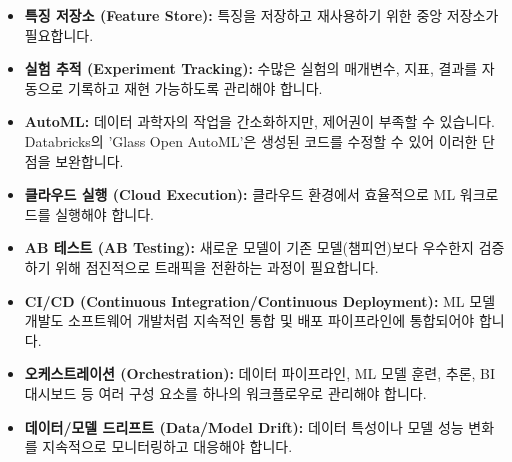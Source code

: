 \documentclass[11pt,a4paper]{article}
\begin{document}
\begin{tcolorbox}[summarybox={ML 개발의 숨겨진 복잡성}]
\begin{itemize}
    \item \textbf{특징 저장소 (Feature Store):} 특징을 저장하고 재사용하기 위한 중앙 저장소가 필요합니다.
    \item \textbf{실험 추적 (Experiment Tracking):} 수많은 실험의 매개변수, 지표, 결과를 자동으로 기록하고 재현 가능하도록 관리해야 합니다.
    \item \textbf{AutoML:} 데이터 과학자의 작업을 간소화하지만, 제어권이 부족할 수 있습니다. Databricks의 'Glass Open AutoML'은 생성된 코드를 수정할 수 있어 이러한 단점을 보완합니다.
    \item \textbf{클라우드 실행 (Cloud Execution):} 클라우드 환경에서 효율적으로 ML 워크로드를 실행해야 합니다.
    \item \textbf{AB 테스트 (AB Testing):} 새로운 모델이 기존 모델(챔피언)보다 우수한지 검증하기 위해 점진적으로 트래픽을 전환하는 과정이 필요합니다.
    \item \textbf{CI/CD (Continuous Integration/Continuous Deployment):} ML 모델 개발도 소프트웨어 개발처럼 지속적인 통합 및 배포 파이프라인에 통합되어야 합니다.
    \item \textbf{오케스트레이션 (Orchestration):} 데이터 파이프라인, ML 모델 훈련, 추론, BI 대시보드 등 여러 구성 요소를 하나의 워크플로우로 관리해야 합니다.
    \item \textbf{데이터/모델 드리프트 (Data/Model Drift):} 데이터 특성이나 모델 성능 변화를 지속적으로 모니터링하고 대응해야 합니다.
\end{itemize}
\end{tcolorbox}
\end{document}
